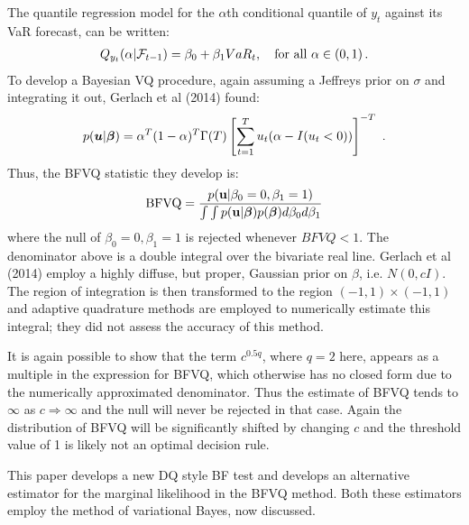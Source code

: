\documentclass[12pt,epsf]{article}
\newcommand{\utwi}[1]{\mbox{\boldmath $ #1$}}
\newcommand{\calF}{{\cal F}}
\begin{document}
The quantile regression model for the $\alpha$th conditional quantile of $y_t$ against its VaR forecast, can be written:
\begin{eqnarray*}
Q_{y_t} (\alpha |\calF_{t-1}  ) = \beta_0  + \beta_1 VaR_t, \quad{\textrm{for all }}\alpha  \in {\rm{(0,1)}} \,.
\end{eqnarray*}
To develop a Bayesian VQ procedure, again assuming a Jeffreys prior on $\sigma$ and integrating it out, Gerlach et al (2014) found:
\begin{eqnarray*}
p(\utwi{u}|\utwi{\beta}) = \alpha^T(1-\alpha)^T \Gamma(T) \left[\sum^{T}_{t=1} u_{t}(\alpha-I(u_t<0)) \right]^{-T} \,\, .
\end{eqnarray*}
Thus, the BFVQ statistic they develop is:
$$
\mbox{BFVQ} = \frac{ p({\bf u}|\beta_0=0, \beta_1=1)}{ \int \int p({\bf u}|\utwi{\beta}) p(\utwi{\beta}) d \beta_0 d \beta_1 }
$$
where the null of $\beta_0=0, \beta_1=1$ is rejected whenever $BFVQ<1$. The denominator above is a double integral over the
bivariate real line. Gerlach et al (2014) employ a highly diffuse, but proper, Gaussian prior on $\beta$, i.e. $N(0,cI)$.
The region of integration is then transformed to the region $(-1,1)\times(-1,1)$ and adaptive quadrature methods are employed to
numerically estimate this integral; they did not assess the accuracy of this method.

It is again possible to show that the term $c^{0.5q}$, where $q=2$ here, appears as a multiple
in the expression for BFVQ, which otherwise has no closed form due to the numerically approximated denominator. Thus the estimate of
BFVQ tends to $\infty$ as $c \Rightarrow \infty$ and the null will never be rejected in that case.
Again the distribution of BFVQ will be significantly shifted by changing $c$ and the threshold value of 1 is likely not an optimal decision rule.

This paper develops a new DQ style BF test and develops an alternative estimator for the marginal likelihood in the BFVQ method. Both these estimators employ the method of variational Bayes, now discussed.
\end{document}
